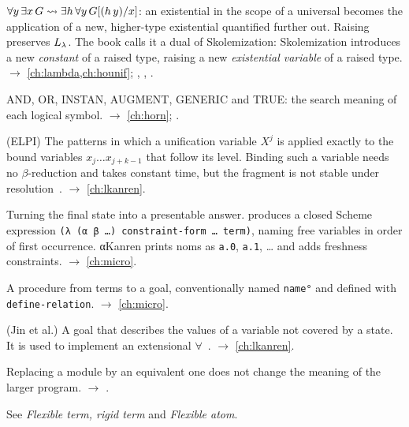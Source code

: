 \begin{glossarylist}
\item[Raising] $\forall y\,\exists x\,G \rightsquigarrow \exists h\,\forall y\,G[(h\,y)/x]$: an existential in the
  scope of a universal becomes the application of a new, higher-type existential quantified further out. Raising
  preserves $L_\lambda$. The book calls it a dual of Skolemization: Skolemization introduces a new \emph{constant} of a
  raised type, raising a new \emph{existential variable} of a raised type. $\rightarrow$ \cref{ch:lambda,ch:hounif};
  , , .
\item[Reduction rules] AND, OR, INSTAN, AUGMENT, GENERIC and TRUE: the search meaning of each logical symbol.
  $\rightarrow$ \cref{ch:horn}; .
\item[Reduction-free fragment $L^{\beta}_{\lambda}$] (ELPI) The patterns in which a unification variable $X^j$ is
  applied exactly to the bound variables $x_j\dots x_{j+k-1}$ that follow its level. Binding such a variable needs no
  $\beta$-reduction and takes constant time, but the fragment is not stable under resolution~\cite{DunchevEtAl2015}.
  $\rightarrow$ \cref{ch:lkanren}.
\item[Reification] Turning the final state into a presentable answer. \micro{} produces a closed Scheme expression
  \texttt{(λ (α β …) constraint-form … term)}, naming free variables in order of first occurrence. αKanren prints
  noms as \texttt{a.0}, \texttt{a.1}, \dots{} and adds freshness constraints. $\rightarrow$ \cref{ch:micro}.
\item[Relation (\micro{})] A procedure from terms to a goal, conventionally named \texttt{name°} and defined with
  \texttt{define-relation}. $\rightarrow$ \cref{ch:micro}.
\item[Relative complement] (Jin et al.) A goal that describes the values of a variable not covered by a state. It
  is used to implement an extensional $\forall$~\cite{JinEtAl2021}. $\rightarrow$ \cref{ch:lkanren}.
\item[Representation independence] Replacing a module by an equivalent one does not change the meaning of the
  larger program. $\rightarrow$ .
\item[Rigid] See \emph{Flexible term, rigid term} and \emph{Flexible atom}.
\end{glossarylist}

